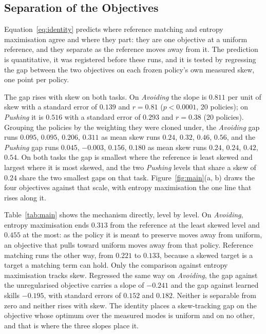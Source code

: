 \documentclass[preprint,12pt]{elsarticle}
\begin{document}
\subsection{Separation of the Objectives}\label{sec:separation}

Equation~\ref{eq:identity} predicts where reference matching and entropy
maximisation agree and where they part: they are one objective at a uniform
reference, and they separate as the reference moves away from it. The prediction
is quantitative, it was registered before these runs, and it is tested by
regressing the gap between the two objectives on each frozen policy's own
measured skew, one point per policy.

The gap rises with skew on both tasks. On \emph{Avoiding} the slope is $0.811$
per unit of skew with a standard error of $0.139$ and $r = 0.81$
($p < 0.0001$, 20 policies); on \emph{Pushing} it is $0.516$ with a standard
error of $0.293$ and $r = 0.38$ (20 policies). Grouping the
policies by the weighting they were cloned under, the \emph{Avoiding} gap runs
$0.095$, $0.095$, $0.206$, $0.311$ as mean skew runs $0.24$, $0.32$, $0.46$,
$0.56$, and the \emph{Pushing} gap runs $0.045$, $-0.003$, $0.156$, $0.180$ as
mean skew runs $0.24$, $0.24$, $0.42$, $0.54$. On both tasks the gap is
smallest where the reference is least skewed and largest where it is most
skewed, and the two \emph{Pushing} levels that share a skew of $0.24$ share the
two smallest gaps on that task. Figure~\ref{fig:main}(a, b) draws the four
objectives against that scale, with entropy maximisation the one line that
rises along it.

Table~\ref{tab:main} shows the mechanism directly, level by level. On
\emph{Avoiding}, entropy maximisation ends $0.313$ from the reference at the least skewed level and
$0.455$ at the most: as the policy it is meant to preserve moves away from
uniform, an objective that pulls toward uniform moves away from that policy.
Reference matching runs the other way, from $0.221$ to $0.133$, because a
skewed target is a target a matching term can hold. Only the comparison against
entropy maximisation tracks skew. Regressed the same way on \emph{Avoiding},
the gap against the unregularised objective carries a slope of $-0.241$ and
the gap against learned skills $-0.195$, with standard errors of $0.152$ and
$0.182$. Neither is separable from zero and neither rises with skew. The identity
places a skew-tracking gap on the objective whose optimum over the measured modes
is uniform and on no other, and that is where the three slopes place it.
\end{document}
